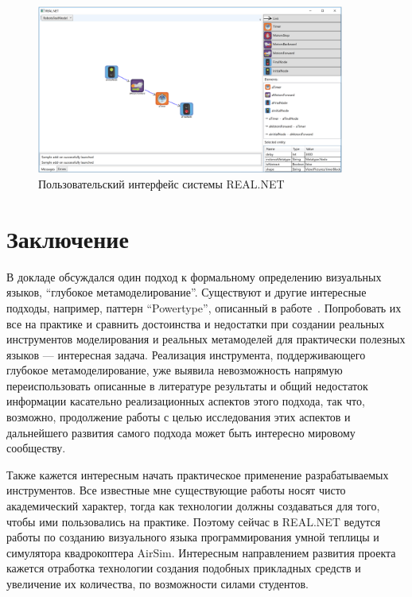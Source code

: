 \documentclass[a5paper]{article}
\begin{document}
\begin{figure}
	\begin{center}
		\includegraphics[width=0.9\textwidth]{realNet.png}
	\end{center}
	\caption{Пользовательский интерфейс системы REAL.NET}
	\label{figure:realNet}
\end{figure}

\section*{Заключение}

В докладе обсуждался один подход к формальному определению визуальных языков, ``глубокое метамоделирование''. Существуют и другие интересные подходы, например, паттерн ``Powertype'', описанный в работе~\cite{gonzalez2006powertype}. Попробовать их все на практике и сравнить достоинства и недостатки при создании реальных инструментов моделирования и реальных метамоделей для практически полезных языков --- интересная задача. Реализация инструмента, поддерживающего глубокое метамоделирование, уже выявила невозможность напрямую переиспользовать описанные в литературе результаты и общий недостаток информации касательно реализационных аспектов этого подхода, так что, возможно, продолжение работы с целью исследования этих аспектов и дальнейшего развития самого подхода может быть интересно мировому сообществу.

Также кажется интересным начать практическое применение разрабатываемых инструментов. Все известные мне существующие работы носят чисто академический характер, тогда как технологии должны создаваться для того, чтобы ими пользовались на практике. Поэтому сейчас в REAL.NET ведутся работы по созданию визуального языка программирования умной теплицы и симулятора квадрокоптера AirSim. Интересным направлением развития проекта кажется отработка технологии создания подобных прикладных средств и увеличение их количества, по возможности силами студентов.



\end{document}
